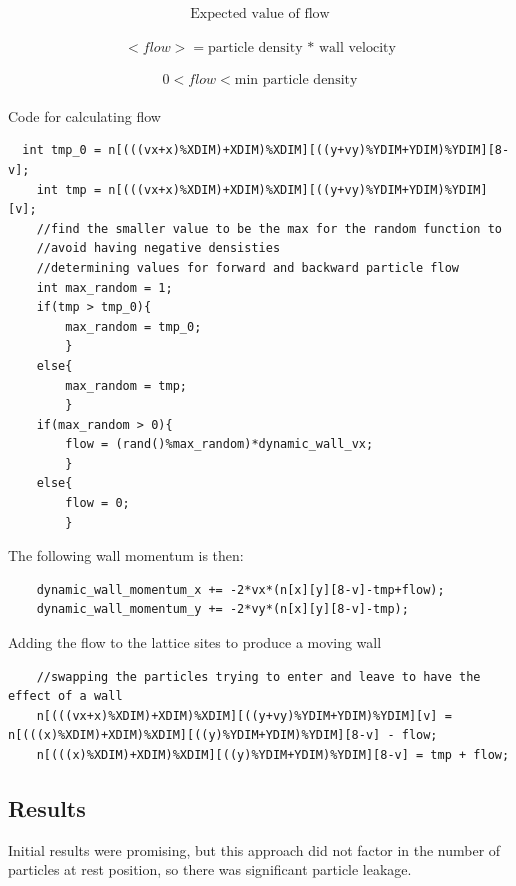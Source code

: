 \documentclass{article}
\begin{document}
$$
\textrm{Expected value of flow}$$\\
$$<flow> = \textrm{particle density * wall velocity}$$\\
$$0 < flow < \textrm{min particle density}$$\\




Code for calculating flow
\begin{verbatim}
  int tmp_0 = n[(((vx+x)%XDIM)+XDIM)%XDIM][((y+vy)%YDIM+YDIM)%YDIM][8-v];
    int tmp = n[(((vx+x)%XDIM)+XDIM)%XDIM][((y+vy)%YDIM+YDIM)%YDIM][v];
	//find the smaller value to be the max for the random function to 
	//avoid having negative densisties
    //determining values for forward and backward particle flow
	int max_random = 1;
	if(tmp > tmp_0){
		max_random = tmp_0;
		}
	else{
		max_random = tmp;
		}
	if(max_random > 0){
		flow = (rand()%max_random)*dynamic_wall_vx;
		}
	else{
		flow = 0;
		}
\end{verbatim}
\vspace{5mm}
The following wall momentum is then:
\begin{verbatim}
    dynamic_wall_momentum_x += -2*vx*(n[x][y][8-v]-tmp+flow);
    dynamic_wall_momentum_y += -2*vy*(n[x][y][8-v]-tmp);
    \end{verbatim}
\vspace{5mm}


\vspace{5mm}
Adding the flow to the lattice sites to produce a moving wall
\begin{verbatim}
    //swapping the particles trying to enter and leave to have the effect of a wall
    n[(((vx+x)%XDIM)+XDIM)%XDIM][((y+vy)%YDIM+YDIM)%YDIM][v] = n[(((x)%XDIM)+XDIM)%XDIM][((y)%YDIM+YDIM)%YDIM][8-v] - flow;
    n[(((x)%XDIM)+XDIM)%XDIM][((y)%YDIM+YDIM)%YDIM][8-v] = tmp + flow;		
    \end{verbatim}
\vspace{5mm}

\subsection{Results}

Initial results were promising, but this approach did not factor in the number of particles at rest position, so there was significant particle leakage.
\end{document}
